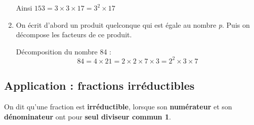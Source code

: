 \documentclass[a4paper,dvipsnames]{article}
\begin{document}
\begin{Mt}
\begin{enumerate}
Ainsi \(153 = 3\times3\times17 = 3^2\times17\)\\

\item On écrit d'abord un produit quelconque qui est égale au nombre \textit{p}. Puis on décompose les facteurs de ce produit.\\

\begin{Ex}
Décomposition du nombre 84 :
\[84=4\times21=2\times2\times7\times3=2^2
\times3\times7\]
\end{Ex} 
\end{enumerate}
\end{Mt}

\begin{Mt}
\end{Mt}

\subsection{Application : fractions irréductibles}

\begin{Def}
On dit qu’une fraction est \textbf{irréductible}, lorsque son \textbf{numérateur} et son \textbf{dénominateur} ont pour \textbf{seul diviseur commun 1}.
\end{Def}

\begin{Mt}
\end{Mt}
\end{document}
